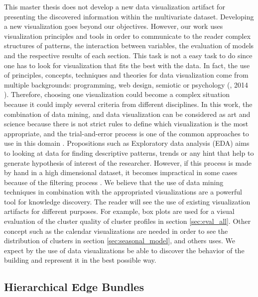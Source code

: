 This master thesis does not develop a new data visualization artifact for presenting the discovered information within the multivariate dataset. Developing a new visualization goes beyond our objectives. However, our work uses visualization principles and tools in order to communicate to the reader complex structures of patterns, the interaction between variables, the evaluation of models and the respective results of each section. This task is not a easy task to do since one has to look for visualization that fits the best with the data. In fact, the use of principles, concepts, techniques and theories for data visualization come from multiple backgrounds: programming, web design, semiotic or psychology (\citeauthor{aparicio2014}, 2014 \cite{aparicio2014}). Therefore, choosing one visualization could become a complex situation because it could imply several criteria from different disciplines. In this work, the combination of data mining, and data visualization can be considered as art and science \cite{aparicio2014, kohavi2001data} because there is not strict rules to define which visualization is the most appropriate, and the trial-and-error process is one of the common approaches to use in this domain \cite{kohavi2001data}. Propositions such as Exploratory data analysis (EDA) aims to looking at data for finding descriptive patterns, trends or any hint that help to generate hypothesis of interest of the researcher. However, if this process is made by hand in a high dimensional dataset, it becomes impractical in some cases because of the filtering process \cite{witten2016data}. We believe that the use of data mining techniques in combination with the appropriated visualizations are a powerful tool for knowledge discovery. The reader will see the use of existing visualization artifacts for different purposes. For example, box plots \cite{williamson1989box} are used for a visual evaluation of the cluster quality of cluster profiles in section \ref{sec:eval_all}. Other concept such as the calendar visualizations \cite{van1999cluster} are needed in order to see the distribution of clusters in section \ref{sec:seasonal_model}, and others uses. We expect by the use of data visualizations be able to discover the behavior of the building and represent it in the best possible way. 

\subsection{Hierarchical Edge Bundles}
\label{sec:edge}


